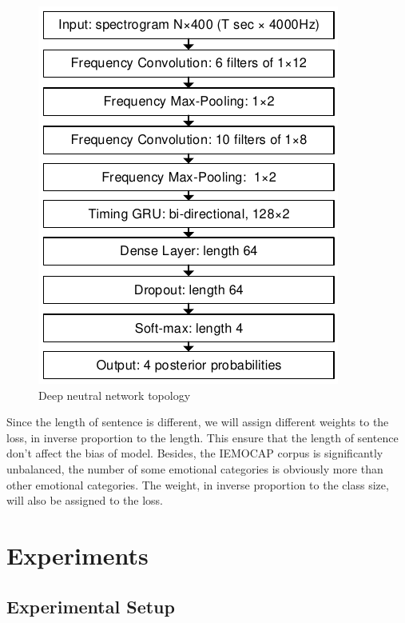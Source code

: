 \documentclass[a4paper]{article}
\begin{document}
\begin{figure}[!htb]
    \centering
    \centerline{\includegraphics{network}}
    \caption{Deep neutral network topology}
    \label{fig:network}
\end{figure}

Since the length of sentence is different, we will assign different weights to the loss, in inverse proportion to the length. This ensure that the length of sentence don't affect the bias of model. Besides, the IEMOCAP corpus is significantly unbalanced, the number of some emotional categories is obviously more than other emotional categories. The weight, in inverse proportion to the class size, will also be assigned to the loss.

\section{Experiments}
\label{sec:experiments}

\subsection{Experimental Setup}
\label{ssec:experimental setup}
\end{document}
